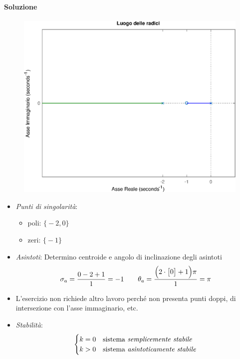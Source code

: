 \paragraph{Soluzione}

\begin{figure}[ht]
	\centering
	\includegraphics[scale=.6]{mod1/assets/rl_ex31}
\end{figure}

\begin{itemize}
	\item \emph{Punti di singolarità}:
		\begin{itemize}
			\item poli: \(\bigl\{-2, 0\bigr\}\)
			\item zeri: \(\bigl\{-1\bigr\}\)
		\end{itemize}
	\item \emph{Asintoti}:
		Determino centroide e angolo di inclinazione degli asintoti
		\[
			\sigma_a = \frac{0 -2 +1}{1} = -1
			\qquad
			\theta_a = \frac{\Bigl(2\cdot\bigl[0\bigr]+1\Bigr)\pi}{1} = \pi
		\]
	\item L'esercizio non richiede altro lavoro perché non presenta punti doppi,
		di intersezione con l'asse immaginario, etc.
	\item \emph{Stabilità}:
		\[\begin{cases}
			k = 0 & \text{sistema \emph{semplicemente stabile}} \\
			k > 0 & \text{sistema \emph{asintoticamente stabile}} \\
		\end{cases}\]
\end{itemize}


